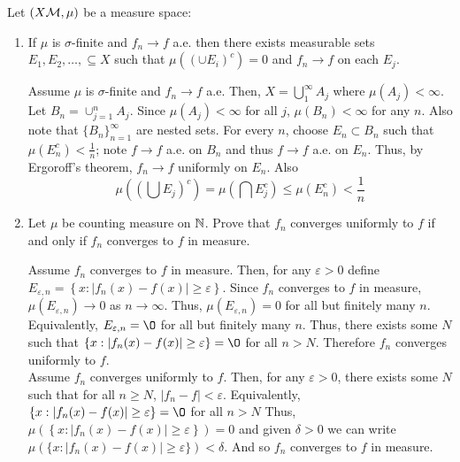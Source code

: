 Let $(X {\mathcal M}, \mu)$ be a measure space:
\begin{enumerate}
\item 	If $\mu$ is $\sigma$-finite and $f_n \rightarrow f$ a.e. then there exists measurable sets $E_1, E_2, \dots, \subseteq X$ such that $\mu((\cup E_i)^c)=0$ and $f_n \rightarrow f$ on each $E_j$.
\begin{pf}
Assume $\mu$ is $\sigma$-finite and $f_n \rightarrow f$ a.e. Then, $ X = \bigcup_{1}^\infty A_j $ where $\mu(A_j) < \infty$. Let $B_n = \cup_{j=1}^n A_j$. Since $\mu(A_j)< \infty$ for all $j$, $\mu(B_n) < \infty$ for any $n$. Also note that $\{B_n\}_{n=1}^\infty$ are nested sets. For every $n$, choose $E_n \subset B_n$ such that $\mu(E_n^c)< \frac{1}{n}$; note $f \rightarrow f$ a.e. on $B_n$ and thus $f \rightarrow f$ a.e. on $E_n$. Thus, by Ergoroff's theorem, $f_n \rightarrow f$ uniformly on $E_n$. Also
\[
\mu\left(\left(\bigcup E_j\right)^c\right)= \mu\left(\bigcap E_j^c\right) \leq \mu(E_n^c)< \frac{1}{n}\] 
\end{pf}

\item Let $\mu$ be counting measure on ${\mathbb N}$. Prove that $f_n$ converges uniformly to $f$ if and only if $f_n$ converges to $f$ in measure.
\begin{pf}
Assume $f_n$ converges to $f$ in measure. Then, for any $\varepsilon>0$ define $E_{\varepsilon, n}=\left\{ x: |f_n(x)-f(x)|\geq \varepsilon \right\}$. Since $f_n$ converges to $f$ in measure, $\mu(E_{\varepsilon, n})\rightarrow 0$ as $n \rightarrow \infty$. Thus, $\mu(E_{\varepsilon, n})=0$ for all but finitely many $n$. Equivalently, $E_{\varepsilon, n}= \O$ for all but finitely many $n$. Thus, there exists some $N$ such that $\left\{ x: |f_n(x)-f(x)|\geq \varepsilon \right\}=\O$ for all $n>N$. Therefore $f_n$ converges uniformly to $f$.
 \\
 Assume $f_n$ converges uniformly to $f$. Then, for any $\varepsilon> 0$, there exists some $N$ such that for all $n \geq N$, $|f_n - f|< \varepsilon$. Equivalently, $\{ x: |f_n(x)-f(x)|\geq \varepsilon \}=\O$ for all $n>N$ Thus, $\mu(\left\{ x: |f_n(x)-f(x)|\geq \varepsilon \right\})=0$ and given $\delta>0$ we can write $\mu(\{ x: |f_n(x)-f(x)|\geq \varepsilon\})< \delta$. And so $f_n$ converges to $f$ in measure.
\end{pf}

\end{enumerate}
